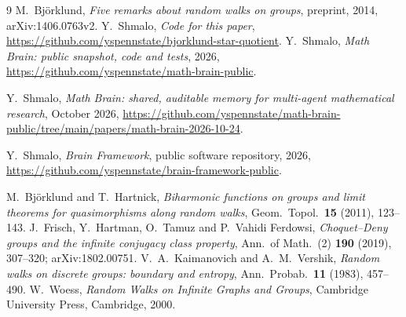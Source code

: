\documentclass[11pt]{amsart}
\theoremstyle{definition}
\theoremstyle{remark}
\begin{document}
\begin{thebibliography}{9}
 M.~Bj\"orklund, \emph{Five remarks about random walks on groups}, preprint, 2014, arXiv:1406.0763v2.
 Y.~Shmalo, \emph{Code for this paper}, \url{https://github.com/yspennstate/bjorklund-star-quotient}.
 Y.~Shmalo, \emph{Math Brain: public snapshot, code and tests}, 2026, \url{https://github.com/yspennstate/math-brain-public}.

 Y.~Shmalo, \emph{Math Brain: shared, auditable memory for multi-agent mathematical research}, October 2026, \url{https://github.com/yspennstate/math-brain-public/tree/main/papers/math-brain-2026-10-24}.

 Y.~Shmalo, \emph{Brain Framework}, public software repository, 2026, \url{https://github.com/yspennstate/brain-framework-public}.

 M.~Bj\"orklund and T.~Hartnick, \emph{Biharmonic functions on groups and limit theorems for quasimorphisms along random walks}, Geom.\ Topol.\ \textbf{15} (2011), 123--143.
 J.~Frisch, Y.~Hartman, O.~Tamuz and P.~Vahidi Ferdowsi, \emph{Choquet--Deny groups and the infinite conjugacy class property}, Ann.\ of Math.\ (2) \textbf{190} (2019), 307--320; arXiv:1802.00751.
 V.~A.~Kaimanovich and A.~M.~Vershik, \emph{Random walks on discrete groups: boundary and entropy}, Ann.\ Probab.\ \textbf{11} (1983), 457--490.
 W.~Woess, \emph{Random Walks on Infinite Graphs and Groups}, Cambridge University Press, Cambridge, 2000.
\end{thebibliography}
\end{document}
